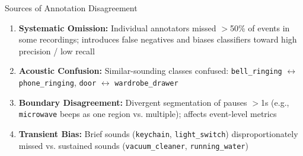 \documentclass[aspectratio=169]{beamer}
\begin{document}
\begin{frame}{Sources of Annotation Disagreement}
  \begin{enumerate}
    \item \textbf{Systematic Omission:} Individual annotators missed $>$50\% of events in some recordings; introduces false negatives and biases classifiers toward high precision / low recall

    \vspace{0.3em}
    \item \textbf{Acoustic Confusion:} Similar-sounding classes confused:
    \texttt{bell\_ringing} $\leftrightarrow$ \texttt{phone\_ringing},
    \texttt{door} $\leftrightarrow$ \texttt{wardrobe\_drawer}

    \vspace{0.3em}
    \item \textbf{Boundary Disagreement:} Divergent segmentation of pauses $>$1s (e.g., \texttt{microwave} beeps as one region vs. multiple); affects event-level metrics

    \vspace{0.3em}
    \item \textbf{Transient Bias:} Brief sounds (\texttt{keychain}, \texttt{light\_switch}) disproportionately missed vs. sustained sounds (\texttt{vacuum\_cleaner}, \texttt{running\_water})
  \end{enumerate}
\end{frame}
\end{document}

